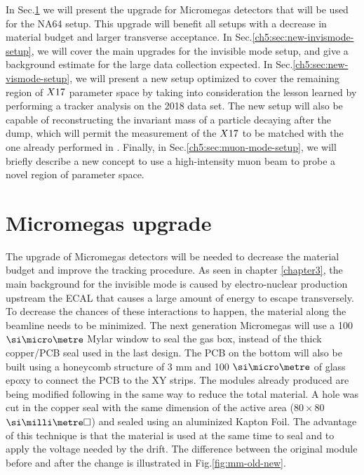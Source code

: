 In Sec.\ref{ch5:sec:mm-upgrades} we will present the upgrade for Micromegas detectors that will be used for the NA64 setup. This upgrade will benefit all setups with a decrease in material budget and larger transverse acceptance. In Sec.\ref{ch5:sec:new-invismode-setup}, we will cover the main upgrades for the invisible mode setup, and give a background estimate for the large data collection expected. In Sec.\ref{ch5:sec:new-vismode-setup}, we will present a new setup optimized to cover the remaining region of $X17$ parameter space by taking into consideration the lesson learned by performing a tracker analysis on the 2018 data set. The new setup will also be capable of reconstructing the invariant mass of a particle decaying after the dump, which will permit the measurement of the $X17$ to be matched with the one already performed in \cite{Krasznahorkay:2015iga,Krasznahorkay:2019lyl}. Finally, in Sec.\ref{ch5:sec:muon-mode-setup}, we will briefly describe a new concept to use a high-intensity muon beam to probe a novel region of parameter space.

\section{Micromegas upgrade}
\label{ch5:sec:mm-upgrades}

The upgrade of Micromegas detectors will be needed to decrease the material budget and improve the tracking procedure. As seen in chapter \ref{chapter3}, the main background for the invisible mode is caused by electro-nuclear production upstream the ECAL that causes a large amount of energy to escape transversely. To decrease the chances of these interactions to happen, the material along the beamline needs to be minimized. The next generation Micromegas will use a 100 $\mum$ Mylar window to seal the gas box, instead of the thick copper/PCB seal used in the last design. The PCB on the bottom will also be built using a honeycomb structure of 3 mm and 100 $\mum$ of glass epoxy to connect the PCB to the XY strips. The modules already produced are being modified following in the same way to reduce the total material. A hole was cut in the copper seal with the same dimension of the active area ($80 \times 80$ $\mms$) and sealed using an aluminized Kapton Foil. The advantage of this technique is that the material is used at the same time to seal and to apply the voltage needed by the drift. The difference between the original module before and after the change is illustrated in Fig.\ref{fig:mm-old-new}.


